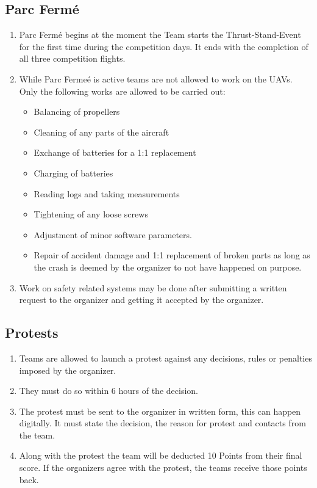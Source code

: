     \subsection{Parc Fermé}
    \begin{enumerate}
      \item Parc Fermé begins at the moment the Team starts the Thrust-Stand-Event for the first time during the competition days. It ends with the completion of all three competition flights. 
      \item While Parc Fermeé is active teams are not allowed to work on the UAVs. Only the following works are allowed to be carried out: 
      \begin{itemize}
        \item Balancing of propellers
        \item Cleaning of any parts of the aircraft
        \item Exchange of batteries for a 1:1 replacement
        \item Charging of batteries 
        \item Reading logs and taking measurements
        \item Tightening of any loose screws
        \item Adjustment of minor software parameters. 
        \item Repair of accident damage and 1:1 replacement of broken parts as long as the crash is deemed by the organizer to not have happened on purpose. 
      \end{itemize}
      \item Work on safety related systems may be done after submitting a written request to the organizer and getting it accepted by the organizer. 
    \end{enumerate}

    \subsection{Protests}
    \begin{enumerate}
      \item Teams are allowed to launch a protest against any decisions, rules or penalties imposed by the organizer.
      \item They must do so within 6 hours of the decision. 
      \item The protest must be sent to the organizer in written form, this can happen digitally. It must state the decision, the reason for protest and contacts from the team.
      \item Along with the protest the team will be deducted 10 Points from their final score. If the organizers agree with the protest, the teams receive those points back. 
    \end{enumerate}

